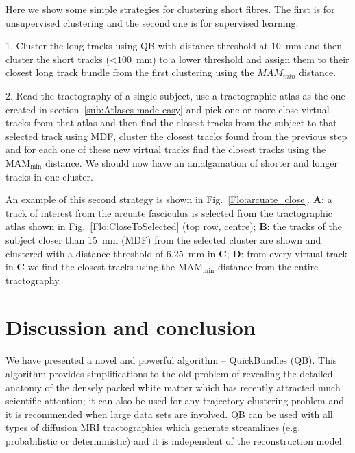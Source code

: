\documentclass{bioinfo}
\begin{document}
Here we show some simple strategies for clustering short fibres. The
first is for unsupervised clustering and the second one is for
supervised learning.

1. Cluster the long tracks using QB with distance threshold at $10$~mm
and then cluster the short tracks (<$100$~mm) to a lower threshold and
assign them to their closest long track bundle from the first clustering
using the $MAM_{min}$ distance.

2. Read the tractography of a single subject, use a tractographic atlas
as the one created in section~\ref{sub:Atlases-made-easy} and pick one
or more close virtual tracks from that atlas and then find the closest
tracks from the subject to that selected track using MDF, cluster the
closest tracks found from the previous step and for each one of these
new virtual tracks find the closest tracks using the
$\textrm{MAM}_{\textrm{min}}$ distance. We should now have an
amalgamation of shorter and longer tracks in one cluster.

An example of this second strategy is shown in
Fig.~\ref{Flo:arcuate_close}. \textbf{A}: a track of interest from the
arcuate fasciculus is selected from the tractographic atlas shown in
Fig.~\ref{Flo:CloseToSelected} (top row, centre); \textbf{B}: the tracks
of the subject closer than 15~mm (MDF) from the selected cluster are
shown and clustered with a distance threshold of $6.25$~mm in
\textbf{C}; \textbf{D}: from every virtual track in \textbf{C} we find
the closest tracks using the $\textrm{MAM}_{\textrm{min}}$ distance from
the entire tractography.

\section{Discussion and conclusion}

We have presented a novel and powerful algorithm -- QuickBundles
(QB). This algorithm provides simplifications to the old problem of
revealing the detailed anatomy of the densely packed white matter which
has recently attracted much scientific attention; it can also be used
for any trajectory clustering problem and it is recommended when large
data sets are involved. QB can be used with all types of diffusion MRI
tractographies which generate streamlines (e.g. probabilistic or
deterministic) and it is independent of the reconstruction model.
\end{document}
